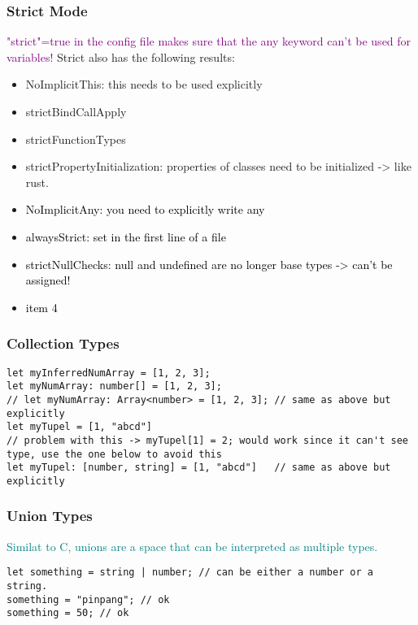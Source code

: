 \documentclass[main.tex,fontsize=8pt,paper=a4,paper=portrait,DIV=calc,]{scrartcl}
\begin{document}
\subsubsection{Strict Mode}
\textcolor{purple}{"strict"=true in the config file makes sure that the any keyword can't be used for variables!}\newline
Strict also has the following results:
\begin{itemize}
  \item NoImplicitThis: this needs to be used explicitly
  \item strictBindCallApply
  \item strictFunctionTypes
  \item strictPropertyInitialization: properties of classes need to be initialized -> like rust.
\item \textcolor{black}{NoImplicitAny: you need to explicitly write any}
\item \textcolor{black}{alwaysStrict: set in the first line of a file}
\item \textcolor{black}{strictNullChecks: null and undefined are no longer base types -> can't be assigned!}
\item \textcolor{black}{item 4}
\end{itemize} 

\subsubsection{Collection Types}
\begin{lstlisting}
let myInferredNumArray = [1, 2, 3];
let myNumArray: number[] = [1, 2, 3];
// let myNumArray: Array<number> = [1, 2, 3]; // same as above but explicitly
let myTupel = [1, "abcd"]
// problem with this -> myTupel[1] = 2; would work since it can't see type, use the one below to avoid this
let myTupel: [number, string] = [1, "abcd"]   // same as above but explicitly
\end{lstlisting}

\subsubsection{Union Types}
\textcolor{teal}{Similat to C, unions are a space that can be interpreted as multiple types.}
\begin{lstlisting}
let something = string | number; // can be either a number or a string.
something = "pinpang"; // ok
something = 50; // ok
\end{lstlisting}
\end{document}
